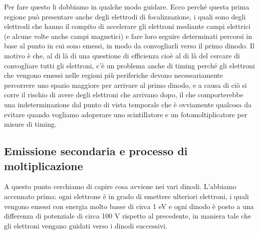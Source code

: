 \vspace{0.4cm}Per fare questo li dobbiamo in qualche modo guidare. Ecco perché questa prima regione può presentare anche degli elettrodi di focalizzazione, i quali sono degli elettrodi che hanno il compito di accelerare gli elettroni mediante campi elettrici (e alcune volte anche campi magnetici) e fare loro seguire determinati percorsi in base al punto in cui sono emessi, in modo da convogliarli verso il primo dinodo. Il motivo è che, al di là di una questione di efficienza cioè al di là del cercare di convogliare tutti gli elettroni, c'è un problema anche di timing perché gli elettroni che vengono emessi nelle regioni più periferiche devono necessariamente percorrere uno spazio maggiore per arrivare al primo dinodo, e a causa di ciò si corre il rischio di avere degli elettroni che arrivano dopo, il che comporterebbe una indeterminazione dal punto di vista temporale che è ovviamente qualcosa da evitare quando vogliamo adoperare uno scintillatore e un fotomoltiplicatore per misure di timing. 

\subsection{Emissione secondaria e processo di moltiplicazione}
A questo punto cerchiamo di capire cosa avviene nei vari dinodi. L'abbiamo accennato prima: ogni elettrone è in grado di emettere ulteriori elettroni, i quali vengono emessi con energia molto basse di circa 1 eV e ogni dinodo è posto a una differenza di potenziale di circa 100 V rispetto al precedente, in maniera tale che gli elettroni vengano guidati verso i dinodi successivi.

